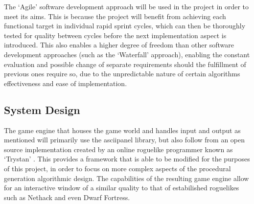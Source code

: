 \documentclass[12pt,a4paper]{article}
\begin{document}
The `Agile' software development approach will be used in the project in order to meet its aims. This is because the project will benefit from achieving each functional target in individual rapid sprint cycles, which can then be thoroughly tested for quality between cycles before the next implementation aspect is introduced. This also enables a higher degree of freedom than other software development approaches (such as the `Waterfall' approach), enabling the constant evaluation and possible change of separate requirements should the fulfillment of previous ones require so, due to the unpredictable nature of certain algorithms effectiveness and ease of implementation.


\subsection{System Design}

The game engine that houses the game world and handles input and output as mentioned will primarily use the asciipanel library, but also follow from an open source implementation created by an online roguelike programmer known as `Trystan' \cite{trystan}. This provides a framework that is able to be modified for the purposes of this project, in order to focus on more complex aspects of the procedural generation algorithmic design. The capabilities of the resulting game engine allow for an interactive window of a similar quality to that of estabilished roguelikes such as Nethack and even Dwarf Fortress. 


\end{document}
